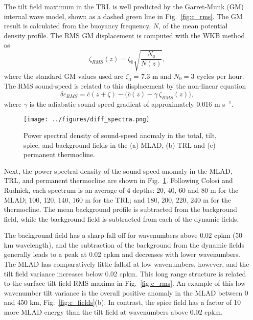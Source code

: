 \documentclass[preprint,NumberedRefs]{JASA}
\begin{document}
The tilt field maximum in the TRL is well predicted by the Garret-Munk (GM) internal wave model, shown as a dashed green line in Fig.~\ref{fig:c_rms}. The GM result is calculated from the buoyancy frequency, $N$, of the mean potential density profile. The RMS GM displacement is computed with the WKB method as
\begin{equation*}
    \zeta_{RMS}(z) = \zeta_0 \sqrt{\frac{N_0}{N(z)}},
\end{equation*}
where the standard GM values used are $\zeta_0$ = 7.3 m and $N_0=3$ cycles per hour.\cite{colosi2016sound} The RMS sound-speed is related to this displacement by the non-linear equation
\begin{equation*}
    \delta c_{RMS} = \bar{c}(z+\zeta)-\big(\bar{c}(z) - \gamma \, \zeta_{RMS}(z)\big),
\end{equation*}
where $\gamma$ is the adiabatic sound-speed gradient of approximately 0.016 m s$^{-1}$.

\begin{figure}
\texttt{[image: ../figures/diff\_spectra.png]}
        \caption{\label{fig:spectra}{Power spectral density of sound-speed anomaly in the total, tilt, spice, and background fields in the (a) MLAD, (b) TRL and (c) permanent thermocline.}}
\end{figure}
Next, the power spectral density of the sound-speed anomaly in the MLAD, TRL, and permanent thermocline are shown in Fig.~\ref{fig:spectra}. Following Colosi and Rudnick,\cite{colosi2020observations} each spectrum is an average of 4 depths: 20, 40, 60 and 80 m for the MLAD; 100, 120, 140, 160 m for the TRL; and 180, 200, 220, 240 m for the thermocline. The mean background profile is subtracted from the background field, while the background field is subtracted from each of the dynamic fields.

The background field has a sharp fall off for wavenumbers above 0.02 cpkm (50 km wavelength), and the subtraction of the background from the dynamic fields generally leads to a peak at 0.02 cpkm and decreases with lower wavenumbers. The MLAD has comparatively little falloff at low wavenumbers, however, and the tilt field variance increases below 0.02 cpkm. This long range structure is related to the surface tilt field RMS maxima in Fig.~\ref{fig:c_rms}. An example of this low wavenumber tilt variance is the overall positive anomaly in the MLAD between 0 and 450 km, Fig.~\ref{fig:c_fields}(b). In contrast, the spice field has a factor of 10 more MLAD energy than the tilt field at wavenumbers above 0.02 cpkm.
\end{document}
